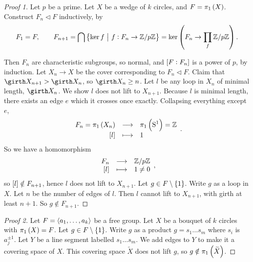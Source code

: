 \begin{proof}[Proof 1]
Let $ p $ be a prime. Let $ X $ be a wedge of $ k $ circles, and $ F = \pi_1\br{X} $. Construct $ F_n \triangleleft F $ inductively, by
$$ F_1 = F, \qquad F_{n + 1} = \bigcap \cbr{\ker f \st f : F_n \to \ZZ / p\ZZ} = \ker \br{F_n \to \prod_f \ZZ / p\ZZ}. $$

\pagebreak

Then $ F_n $ are characteristic subgroups, so normal, and $ \sbr{F : F_n} $ is a power of $ p $, by induction. Let $ X_n \to X $ be the cover corresponding to $ F_n \triangleleft F $. Claim that $ \girth X_{n + 1} > \girth X_n $, so $ \girth X_n \ge n $. Let $ l $ be any loop in $ X_n $ of minimal length, $ \girth X_n $. We show $ l $ does not lift to $ X_{n + 1} $. Because $ l $ is minimal length, there exists an edge $ e $ which it crosses once exactly. Collapsing everything except $ e $,
$$ \function{F_n = \pi_1\br{X_n}}{\pi_1\br{\S^1} = \ZZ}{\sbr{l}}{1}. $$
So we have a homomorphism
$$ \function{F_n}{\ZZ / p\ZZ}{\sbr{l}}{1 \ne 0}, $$
so $ \sbr{l} \notin F_{n + 1} $, hence $ l $ does not lift to $ X_{n + 1} $. Let $ g \in F \setminus \cbr{1} $. Write $ g $ as a loop in $ X $. Let $ n $ be the number of edges of $ l $. Then $ l $ cannot lift to $ X_{n + 1} $, with girth at least $ n + 1 $. So $ g \notin F_{n + 1} $.
\end{proof}

\begin{proof}[Proof 2]
Let $ F = \left\langle a_1, \dots, a_k \right\rangle $ be a free group. Let $ X $ be a bouquet of $ k $ circles with $ \pi_1\br{X} = F $. Let $ g \in F \setminus \cbr{1} $. Write $ g $ as a product $ g = s_1 \dots s_m $ where $ s_i $ is $ a_j^{\pm 1} $. Let $ Y $ be a line segment labelled $ s_1 \dots s_m $. We add edges to $ Y $ to make it a covering space of $ X $. This covering space $ \widetilde{X} $ does not lift $ g $, so $ g \notin \pi_1\br{\widetilde{X}} $.
\end{proof}


